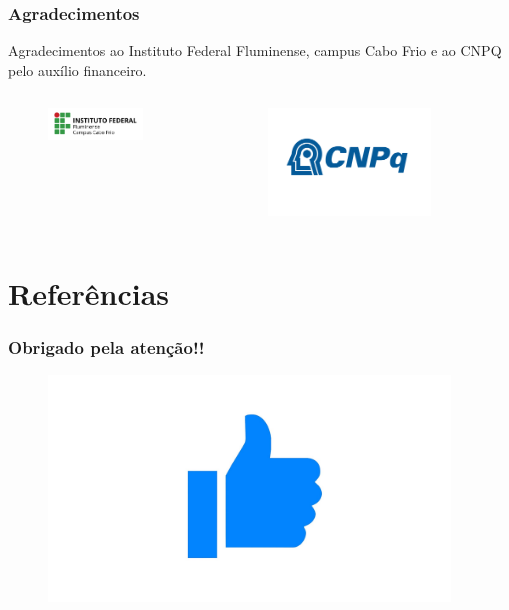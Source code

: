 \documentclass{beamer}
\begin{document}
	\begin{frame}
		\frametitle{Agradecimentos}
		Agradecimentos ao Instituto Federal Fluminense, campus Cabo Frio e ao CNPQ pelo auxílio financeiro.
		\begin{columns}
				\begin{figure}[htb]
					\includegraphics[width=0.8\textwidth]{img/iff.png}
				\end{figure}
				
				\begin{figure}[htb]
					\includegraphics[width=0.8\textwidth]{img/cnpq.png}
				\end{figure}
		\end{columns}

	\end{frame}


	\section*{Referências}
		\begin{frame}
		\frametitle{Obrigado pela atenção!!}
			\begin{figure}[htb]
				\includegraphics[width=0.95\textwidth]{img/obrigado.jpg}
			\end{figure}
		\end{frame}
	
	
\end{document}
